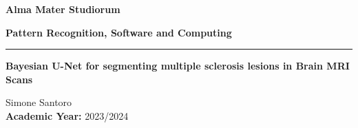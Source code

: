 \documentclass[12pt]{report}
\begin{document}
\begin{titlepage}
\begin{center}
\vspace*{1in}

\Huge
\textbf{Alma Mater Studiorum}
\vspace{0.1in}

\vspace{0.2in}
\Large
\textbf{Pattern Recognition, Software and Computing}
\rule{14cm}{0.4pt} %
\vspace{0.3in}

\vspace{0.5in}
\Huge{\textbf{Bayesian U-Net for segmenting multiple sclerosis lesions in Brain MRI Scans}}

\vspace{0.5in}
\Large
Simone Santoro \\

\vspace{3in} %
\textbf{Academic Year:} 2023/2024

\end{center}
\end{titlepage}

\tableofcontents


%
%
%

\appendix
%




\nocite{*}

\end{document}
